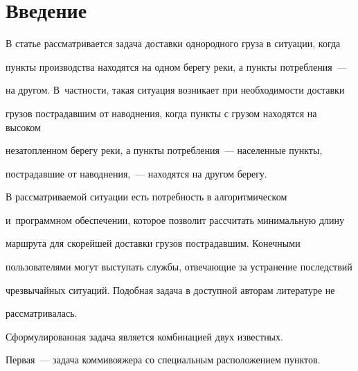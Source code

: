       \thispagestyle{headings}


      


                        \vspace*{-18pt}





\section{Введение}





\vspace*{-2pt}





  В статье рассматривается задача доставки однородного груза в ситуации, когда 


пункты производства находятся на одном берегу реки, а пункты потребления~--- 


на другом. В~частности, такая ситуация возникает при необходимости доставки 


грузов пострадавшим от наводнения, когда пункты с грузом находятся на высоком 


незатопленном берегу реки, а пункты потребления~--- населенные пункты, 


пострадавшие от наводнения,~--- находятся на другом берегу. 


  


  В рассматриваемой ситуации есть потребность в алгоритмическом 


и~про\-грам\-мном обеспечении, которое позволит рассчитать минимальную длину 


маршрута для скорейшей доставки грузов пострадавшим. Конечными 


пользователями могут выступать службы, отвечающие за устранение последствий 


чрезвычайных ситуаций. Подобная задача в доступной авторам литературе не 


рассматривалась.


  


  Сформулированная задача является комбинацией двух известных.


  


  Первая~--- задача коммивояжера со специальным расположением пунктов. 


